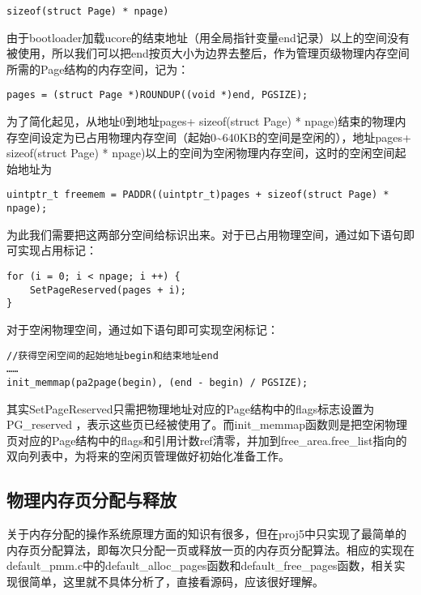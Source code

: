 \begin{lstlisting}
sizeof(struct Page) * npage)
\end{lstlisting}

由于bootloader加载ucore的结束地址（用全局指针变量end记录）以上的空间没有被使用，所以我们可以把end按页大小为边界去整后，作为管理页级物理内存空间所需的Page结构的内存空间，记为：

\begin{lstlisting}
pages = (struct Page *)ROUNDUP((void *)end, PGSIZE);
\end{lstlisting}

为了简化起见，从地址0到地址pages+ sizeof(struct Page) *
npage)结束的物理内存空间设定为已占用物理内存空间（起始0\textasciitilde{}640KB的空间是空闲的），地址pages+
sizeof(struct Page) *
npage)以上的空间为空闲物理内存空间，这时的空闲空间起始地址为

\begin{lstlisting}
uintptr_t freemem = PADDR((uintptr_t)pages + sizeof(struct Page) * npage);
\end{lstlisting}

为此我们需要把这两部分空间给标识出来。对于已占用物理空间，通过如下语句即可实现占用标记：

\begin{lstlisting}
for (i = 0; i < npage; i ++) {
    SetPageReserved(pages + i);
}
\end{lstlisting}

对于空闲物理空间，通过如下语句即可实现空闲标记：

\begin{lstlisting}
//获得空闲空间的起始地址begin和结束地址end
……
init_memmap(pa2page(begin), (end - begin) / PGSIZE);
\end{lstlisting}

其实SetPageReserved只需把物理地址对应的Page结构中的flags标志设置为PG\_reserved
，表示这些页已经被使用了。而init\_memmap函数则是把空闲物理页对应的Page结构中的flags和引用计数ref清零，并加到free\_area.free\_list指向的双向列表中，为将来的空闲页管理做好初始化准备工作。

\subsection{物理内存页分配与释放}\label{ux7269ux7406ux5185ux5b58ux9875ux5206ux914dux4e0eux91caux653e}

关于内存分配的操作系统原理方面的知识有很多，但在proj5中只实现了最简单的内存页分配算法，即每次只分配一页或释放一页的内存页分配算法。相应的实现在default\_pmm.c中的default\_alloc\_pages函数和default\_free\_pages函数，相关实现很简单，这里就不具体分析了，直接看源码，应该很好理解。

